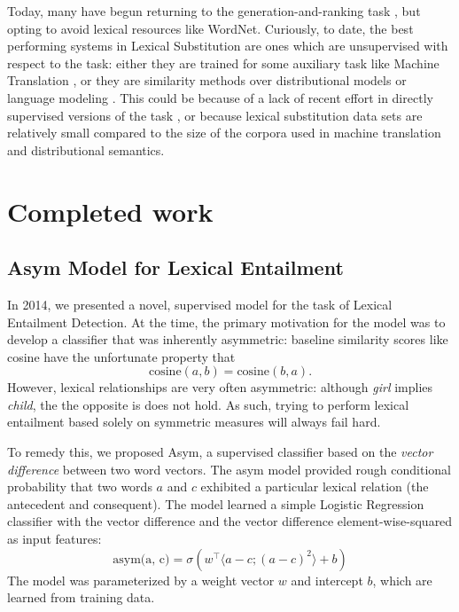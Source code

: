 \documentclass[letterpaper]{article}
\begin{document}
Today, many have begun returning to the generation-and-ranking task
\cite{kawakami:2015:arxiv,melamud:2015:naacl,roller:2016:naacl}, but opting to
avoid lexical resources like WordNet.  Curiously, to date, the best performing
systems in Lexical Substitution are ones which are unsupervised with respect to
the task: either they are trained for some auxiliary task like Machine
Translation \cite{kawakami:2015:arxiv}, or they are similarity methods over
distributional models \cite{roller:2016:naacl} or language modeling
\cite{melamud:2015:naacl}. This could be because of a lack of recent effort in
directly supervised versions of the task \cite{szarvas:2013:naacl}, or because
lexical substitution data sets are relatively small compared to the size of the
corpora used in machine translation and distributional semantics.

\section{Completed work}

\subsection{Asym Model for Lexical Entailment \cite{roller:2014:coling}}

In 2014, we presented a novel, supervised model for the task of Lexical
Entailment Detection. At the time, the primary
motivation for the model was to develop a classifier that was inherently
asymmetric: baseline similarity scores like cosine have the unfortunate
property that
\begin{equation*}
  \text{cosine}(a, b) = \text{cosine}(b, a).
\end{equation*}
However, lexical relationships are very often asymmetric: although {\em girl}
implies {\em child}, the the opposite is does not hold. As such, trying to
perform lexical entailment based solely on symmetric measures will always
fail hard.

To remedy this, we proposed Asym, a supervised classifier based on the
{\em vector difference} between two word vectors. The asym model provided
rough conditional probability that two words $a$ and $c$ exhibited a particular
lexical relation (the antecedent and consequent). The model learned a simple
Logistic Regression classifier with the vector difference and the vector
difference element-wise-squared as input features:
\begin{equation*}
  \text{asym({a}, {c})} = \sigma\left({w}^\top \langle{a} - {c}; ({a} - {c})^2\rangle + b\right)
\end{equation*}
The model was parameterized by a weight vector $w$ and intercept $b$, which are
learned from training data.
\end{document}
